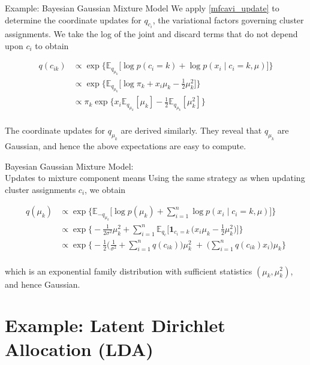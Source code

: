 \documentclass[10pt]{beamer}
\newcommand{\ds}{\displaystyle}
\newcommand{\df}{\displaystyle\frac}
\newcommand{\+}[1]{\ensuremath{{\boldsymbol #1}}} %
\newcommand{\cond}{\; | \;}
\newcommand{\E}{\mathbb{E}}
\begin{document}
\begin{frame}{Example: Bayesian Gaussian Mixture Model}
We apply \eqref{mfcavi_update} to determine the coordinate updates for $q_{c_i}$, the variational factors governing cluster assignments.   We take the log of the joint and discard terms that do not depend upon $c_i$ to obtain

\begin{align*}
q(c_{ik}) & \propto \exp \bigg\{ \E_{q_{\mu_k}} \bigg[  \log p(c_i =k) + \log p(x_i \cond c_i=k, \mu) \bigg] \bigg\} \\
& \propto \exp \bigg\{ \E_{q_{\mu_k}} \bigg[ \log \pi_k + x_i \mu_k - \df{1}{2} \mu_k^2 \bigg] \bigg\} \\
& \propto \pi_k \exp \bigg\{ x_i \E_{q_{\mu_k}} [\mu_k] - \df{1}{2}  \E_{q_{\mu_k}} [ \mu_k^2] \bigg\} \\
\end{align*}

The coordinate updates for $q_{\mu_k}$ are derived similarly.  They reveal that $q_{\mu_k}$ are Gaussian, and hence the above expectations are easy to compute. 

\end{frame}

\begin{frame}{Bayesian Gaussian Mixture Model: \\ Updates to mixture component means}
Using the same strategy as when updating cluster assignments $c_i$, we obtain

\begin{align*}
q(\mu_k) & \propto \exp \bigg\{ \E_{-q_{\mu_k}} \bigg[  \log p(\mu_k) + \ds\sum_{i=1}^n \log p(x_i \cond c_i=k, \mu) \bigg] \bigg\} \\
& \propto \exp \bigg\{ -\df{1}{2  \sigma^2} \mu_k^2 +  \ds\sum_{i=1}^{n} \E_{q_c} \bigg[ \+1_{c_i=k}\, \bigg(x_i \mu_k - \df{1}{2} \mu_k^2\bigg) \bigg] \bigg\} \\
& \propto \exp \bigg\{ -\df{1}{2} \bigg(\df{1}{ \sigma^2} + \ds\sum_{i=1}^n q(c_{ik}) \bigg) \mu_k^2 \; +  \;  \bigg( \ds\sum_{i=1}^n q(c_{ik})x_i  \bigg) \mu_k \bigg\} \\
\end{align*}

which is an exponential family distribution with sufficient statistics $(\mu_k, \mu_k^2)$, and hence Gaussian.

\end{frame}


\section{Example: Latent Dirichlet Allocation (LDA)}
\end{document}
